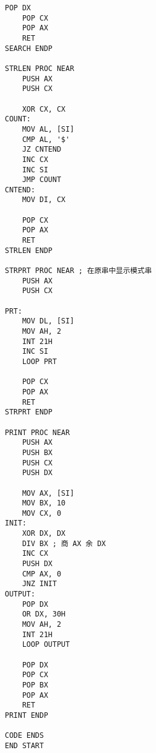 \documentclass[12pt,AutoFakeBold]{article}
\begin{document}
\begin{lstlisting}[language={[x86masm]Assembler}]
    POP DX
    POP CX
    POP AX
    RET
SEARCH ENDP

STRLEN PROC NEAR
    PUSH AX
    PUSH CX
    
    XOR CX, CX
COUNT:
    MOV AL, [SI]
    CMP AL, '$'
    JZ CNTEND
    INC CX
    INC SI
    JMP COUNT
CNTEND:
    MOV DI, CX
    
    POP CX
    POP AX
    RET    
STRLEN ENDP

STRPRT PROC NEAR ; 在原串中显示模式串
    PUSH AX
    PUSH CX
    
PRT:
    MOV DL, [SI]
    MOV AH, 2    
    INT 21H
    INC SI
    LOOP PRT
    
    POP CX
    POP AX
    RET    
STRPRT ENDP

PRINT PROC NEAR
    PUSH AX
    PUSH BX
    PUSH CX
    PUSH DX
    
    MOV AX, [SI]
    MOV BX, 10
    MOV CX, 0
INIT:
    XOR DX, DX
    DIV BX ; 商 AX 余 DX
    INC CX
    PUSH DX
    CMP AX, 0
    JNZ INIT
OUTPUT:
    POP DX
    OR DX, 30H
    MOV AH, 2
    INT 21H
    LOOP OUTPUT
    
    POP DX
    POP CX
    POP BX
    POP AX
    RET
PRINT ENDP

CODE ENDS
END START
\end{lstlisting}



\end{document}
